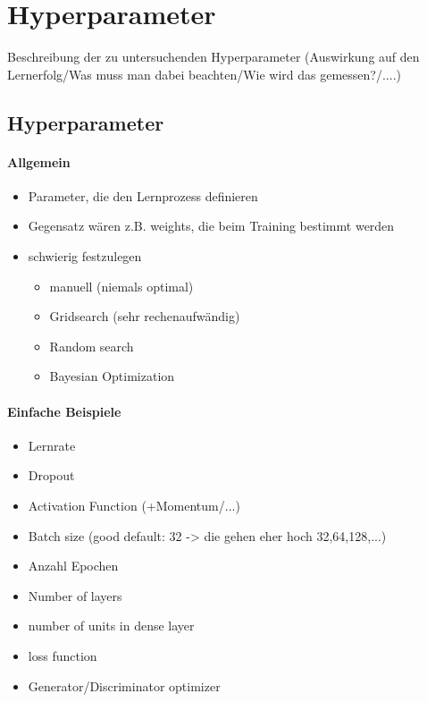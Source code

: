 \section{Hyperparameter}
Beschreibung der zu untersuchenden Hyperparameter (Auswirkung auf den Lernerfolg/Was muss man dabei beachten/Wie wird das gemessen?/....)

\subsection{Hyperparameter}
\paragraph{Allgemein \cite{hyperparameters-search-in-machine-learning, hyperparameters-gan-using-genetic-algorithm}}
\begin{itemize}
	\item Parameter, die den Lernprozess definieren
	\item Gegensatz wären z.B. weights, die beim Training bestimmt werden
	\item schwierig festzulegen
	\begin{itemize}
		\item manuell (niemals optimal)
		\item Gridsearch (sehr rechenaufwändig)  \cite{hyperparameters-grid-search}
		\item Random search
		\item Bayesian Optimization
	\end{itemize}
\end{itemize}

\paragraph{Einfache Beispiele \cite{hyperparameters-gan-using-genetic-algorithm, hyperparameters-what-how}}
\begin{itemize}
	\item Lernrate
	\item Dropout
	\item Activation Function (+Momentum/...)
	\item Batch size (good default: 32 -> die gehen eher hoch 32,64,128,...)
	\item Anzahl Epochen
	\item Number of layers
	\item number of units in dense layer
	\item loss function
	\item Generator/Discriminator optimizer
\end{itemize}

